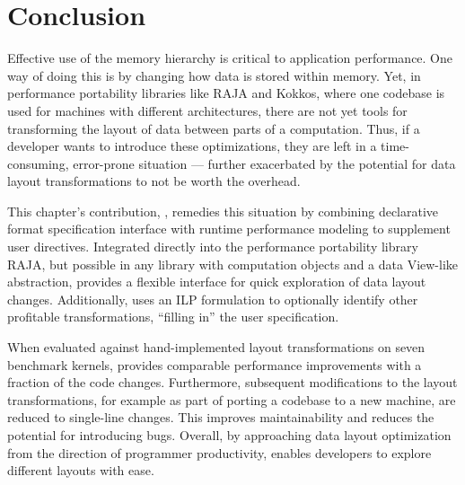 \section{Conclusion}


Effective use of the memory hierarchy is critical to application performance.
One way of doing this is by changing how data is stored within memory.
Yet, in performance portability libraries like RAJA and Kokkos, where one codebase is used for machines with different architectures, there are not yet tools for transforming the layout of data between parts of a computation. 
Thus, if a developer wants to introduce these optimizations, they are left in a time-consuming, error-prone situation --- further exacerbated by the potential for data layout transformations to not be worth the overhead.

This chapter's contribution, \FormatDecisions, remedies this situation by combining declarative format specification  interface with runtime performance modeling to supplement user directives.
Integrated directly into the performance portability library RAJA, but possible in any library with computation objects and a data View-like abstraction, \FormatDecisions{} provides a flexible interface for quick exploration of data layout changes. 
Additionally, \FormatDecisions{} uses an ILP formulation to optionally identify other profitable transformations, \enquote{filling in} the user specification.

When evaluated against hand-implemented layout transformations on seven benchmark kernels, \FormatDecisions{} provides comparable performance improvements with a fraction of the code changes.
Furthermore, subsequent modifications to the layout transformations, for example as part of porting a codebase to a new machine, are reduced to single-line changes. 
This improves maintainability and reduces the potential for introducing bugs.
Overall, by approaching data layout optimization from the direction of programmer productivity, \FormatDecisions{} enables developers to explore different layouts with ease. 
